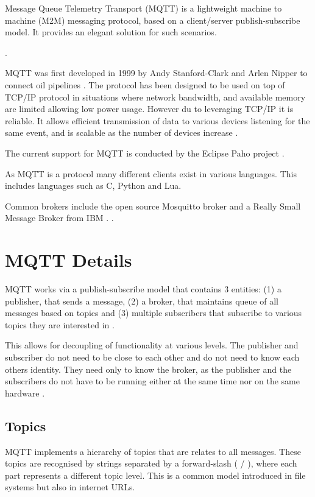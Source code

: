 \documentclass[sigconf]{acmart}
\begin{document}
Message Queue Telemetry Transport (MQTT) is a lightweight machine to
machine (M2M) messaging protocol, based on a client/server 
publish-subscribe model. It provides an elegant solution for such
scenarios.

.

MQTT was first developed in 1999 by Andy Stanford-Clark and
Arlen Nipper to connect oil pipelines \cite{hivemq-website}. The
protocol has been designed to be used on top of TCP/IP protocol in
situations where network bandwidth, and available memory are limited
allowing low power usage. However du to leveraging TCP/IP it is
reliable. It allows efficient transmission of data to
various devices listening for the same event, and is scalable as the
number of devices increase \cite{mqtt-wiki}\cite{mqtt-official}.

The current support for MQTT is conducted by the Eclipse Paho project \cite{eclipse-mosquitto}.

As MQTT is a protocol many different clients exist in 
various languages. This includes languages such as C, Python and Lua. 

Common brokers include the open
source Mosquitto broker \cite{mqtt-official} and a Really Small Message Broker from IBM
\cite{eclipse-mosquitto}.
.


\section{MQTT Details}

MQTT works via a publish-subscribe model that contains 3 entities: (1) a
publisher, that sends a message, (2) a broker, that maintains queue of all
messages based on topics and (3) multiple subscribers that subscribe to
various topics they are interested in \cite{how-mqtt-works}.

This allows for decoupling of functionality at various levels. The
publisher and subscriber do not need to be close to each other and do
not need to know each others identity. They need only to know the
broker, as the publisher and the subscribers do not have to be running
either at the same time nor on the same hardware
\cite{hivemq-details}.


\subsection{Topics}

MQTT implements a hierarchy of topics that are relates
to all messages. These topics are recognised by strings separated by a
forward-slash ( / ), where each part represents a different topic
level. This is a common model introduced in file systems but also in
internet URLs. 
\end{document}
